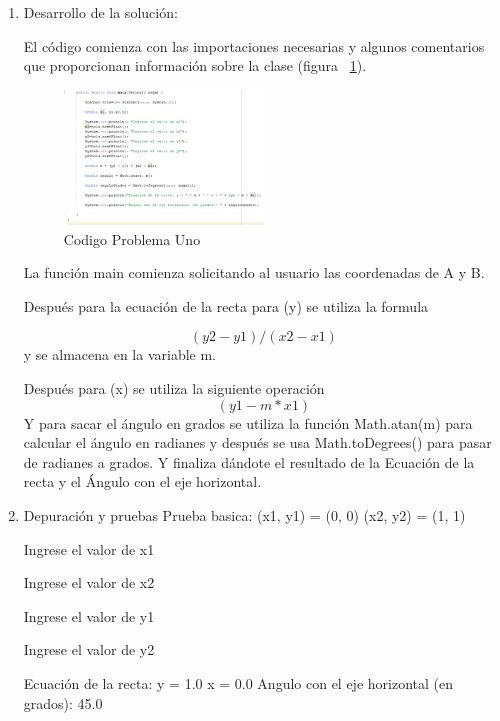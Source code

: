 \documentclass{IEEEcsmag}
\begin{document}
\begin{enumerate}
\item  Desarrollo de la solución:



	El código comienza con las importaciones necesarias y algunos comentarios que proporcionan información sobre la clase (figura ~\ref{fig:codigoP1}). 
 
\begin{figure}
\caption{Codigo Problema Uno}
\centerline{\includegraphics[width=0.5\textwidth]{./latex-imagenes/codigoprob1.jpg}}
\vspace*{7pt}
\label{fig:codigoP1}
\end{figure}

	La función main comienza solicitando al usuario las coordenadas de A y B.
 
	Después para la ecuación de la recta para (y) se utiliza la formula 
 
 \begin{equation}
     (y2 - y1) / (x2 - x1)
 \end{equation}
 y se almacena en la variable m.
 
	Después para (x) se utiliza la siguiente operación 
  \begin{equation}
      (y1 - m * x1)
  \end{equation}
	Y para sacar el ángulo en grados se utiliza la función Math.atan(m) para calcular el ángulo en radianes y después se usa Math.toDegrees() para pasar de radianes a grados.\newline
	Y finaliza dándote el resultado de la Ecuación de la recta y el Ángulo con el eje horizontal.\newline
\item  Depuración y pruebas \newline
	Prueba basica:\newline
	(x1, y1) = (0, 0)\newline
	(x2, y2) = (1, 1)\newline

	Ingrese el valor de x1

	Ingrese el valor de x2

	Ingrese el valor de y1

	Ingrese el valor de y2\newline

Ecuación de la recta: y = 1.0  x = 0.0
Angulo con el eje horizontal (en grados):  45.0

\end{enumerate}
\vspace*{5pt}
\end{document}
